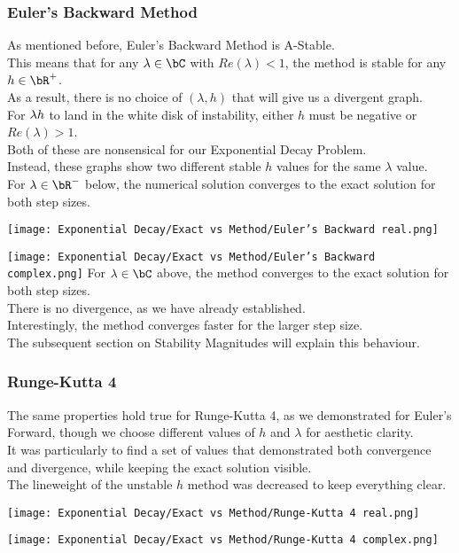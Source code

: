 \subsubsection{Euler's Backward Method}
\begin{multicols}{2}
	As mentioned before, Euler's Backward Method is A-Stable.\\
	This means that for any $\lambda \in \bC$ with $Re(\lambda) < 1$, the method is stable for any $h \in \bR^{+}$.\\
	As a result, there is no choice of $(\lambda, h)$ that will give us a divergent graph.\\
	For $\lambda h$ to land in the white disk of instability, either $h$ must be negative or $Re(\lambda) > 1$.\\
	Both of these are nonsensical for our Exponential Decay Problem.\\
	Instead, these graphs show two different stable $h$ values for the same $\lambda$ value.\\
	For $\lambda \in \bR^{-}$ below, the numerical solution converges to the exact solution for both step sizes.\\
	\begin{center}
	\texttt{[image: Exponential Decay/Exact vs Method/Euler's Backward real.png]}
	\end{center}
	\columnbreak{}
	\vspace*{-1.5cm}
	\texttt{[image: Exponential Decay/Exact vs Method/Euler's Backward complex.png]}
	For $\lambda \in \bC$ above, the method converges to the exact solution for both step sizes.\\
	There is no divergence, as we have already established.\\
	Interestingly, the method converges faster for the larger step size.\\
	The subsequent section on Stability Magnitudes will explain this behaviour.
\end{multicols}
\subsubsection{Runge-Kutta 4}
\begin{multicols}{2}
	The same properties hold true for Runge-Kutta 4, as we demonstrated for Euler's Forward, though we choose different values of $h$ and $\lambda$ for aesthetic clarity.\\
	It was particularly to find a set of values that demonstrated both convergence and divergence, while keeping the exact solution visible.\\
	The lineweight of the unstable $h$ method was decreased to keep everything clear.\\
	\begin{center}
	\texttt{[image: Exponential Decay/Exact vs Method/Runge-Kutta 4 real.png]}
        \end{center}
\columnbreak{}
	\vspace*{-1.5cm}
	\begin{center}
	\texttt{[image: Exponential Decay/Exact vs Method/Runge-Kutta 4 complex.png]}
	\end{center}
\end{multicols}
\newpage
